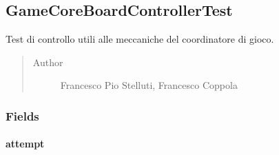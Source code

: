\documentclass[letterpaper,10pt,italian,openany,oneside]{sphinxmanual}
\begin{document}
\label{\detokenize{test/it/unicam/cs/pa/mastermind/test/package-index:package-it.unicam.cs.pa.mastermind.test}}

\subsection{GameCoreBoardControllerTest}
\label{\detokenize{test/it/unicam/cs/pa/mastermind/test/GameCoreBoardControllerTest:gamecoreboardcontrollertest}}\label{\detokenize{test/it/unicam/cs/pa/mastermind/test/GameCoreBoardControllerTest::doc}}

\begin{fulllineitems}
\label{\detokenize{test/it/unicam/cs/pa/mastermind/test/GameCoreBoardControllerTest:it.unicam.cs.pa.mastermind.test.GameCoreBoardControllerTest}}
Test di controllo utili alle meccaniche del coordinatore di gioco.
\begin{quote}\begin{description}
\item[{Author}] \leavevmode
Francesco Pio Stelluti, Francesco Coppola

\end{description}\end{quote}

\end{fulllineitems}



\subsubsection{Fields}
\label{\detokenize{test/it/unicam/cs/pa/mastermind/test/GameCoreBoardControllerTest:fields}}

\paragraph{attempt}
\label{\detokenize{test/it/unicam/cs/pa/mastermind/test/GameCoreBoardControllerTest:attempt}}

\begin{fulllineitems}
\label{\detokenize{test/it/unicam/cs/pa/mastermind/test/GameCoreBoardControllerTest:it.unicam.cs.pa.mastermind.test.GameCoreBoardControllerTest.attempt}}
\end{fulllineitems}
\end{document}
